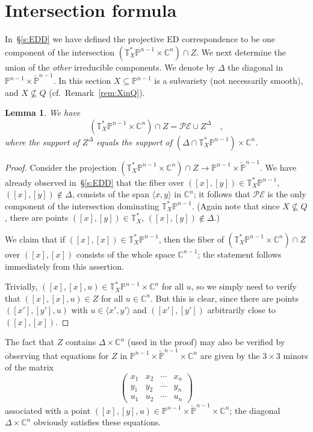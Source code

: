 \documentclass[11pt]{amsart}
\newtheorem{lemma}[theorem]{Lemma}
\numberwithin{equation}{section}
\newcommand{\Cbb}{{\mathbb{C}}}
\newcommand{\Pbb}{{\mathbb{P}}}
\newcommand{\cPbb}{{\check\Pbb}}
\newcommand{\Tbb}{{\mathbb{T}}}
\newcommand{\cE}{{\mathcal E}}
\newcommand{\cP}{{\mathcal P}}
\begin{document}

\section{Intersection formula}\label{s:If}

In~\S\ref{s:EDD} we have defined the projective ED correspondence to be one component
of the intersection $(\Tbb^*_X\Pbb^{n-1}\times \Cbb^n)\cap Z$. We next determine
the union of the {\em other\/} irreducible components.
We denote by $\Delta$ the diagonal in $\Pbb^{n-1}\times \cPbb^{n-1}$.
In this section $X\subseteq \Pbb^{n-1}$ is a subvariety (not necessarily smooth),
and $X\not\subseteq Q$ (cf.~Remark~\ref{rem:XinQ}).

\begin{lemma}\label{lem:Zdec}
We have
\[
(\Tbb^*_X\Pbb^{n-1}\times \Cbb^n)\cap Z = \cP\cE\cup Z^\Delta\quad,
\] 
where the support of $Z^\Delta$ equals the support of
$(\Delta\cap \Tbb^*_X\Pbb^{n-1})\times \Cbb^n$.
\end{lemma}

\begin{proof}
Consider the projection $(\Tbb^*_X\Pbb^{n-1}\times \Cbb^n)\cap Z \to \Pbb^{n-1}\times 
\cPbb^{n-1}$. We have already observed in~\S\ref{s:EDD} that the fiber over 
$([x],[y])\in \Tbb^*_X\Pbb^{n-1}$, $([x],[y])\not\in \Delta$, consists of the span $\langle x,y\rangle$
in $\Cbb^n$; it follows that $\cP\cE$ is the only component of the intersection dominating
$\Tbb^*_X\Pbb^{n-1}$. (Again note that since $X\not\subseteq Q$, there are points
$([x],[y])\in \Tbb^*_X$, $([x],[y])\not\in \Delta$.)

We claim that if $([x],[x])\in \Tbb^*_X\Pbb^{n-1}$, then the fiber of
$(\Tbb^*_X\Pbb^{n-1}\times \Cbb^n)\cap Z$ over $([x],[x])$ consists of the whole
space $\Cbb^{n-1}$; the statement follows immediately from this assertion.

Trivially, $([x],[x],u)\in \Tbb^*_X\Pbb^{n-1}\times \Cbb^n$ for all $u$, so we simply need to
verify that $([x],[x],u)\in Z$ for all $u\in \Cbb^n$. But this is clear, since there are points
$([x'],[y'],u)$ with $u\in \langle x', y'\rangle$ and $([x'],[y'])$ arbitrarily close to $([x],[x])$.
\end{proof}

The fact that $Z$ contains $\Delta\times \Cbb^n$ (used in the proof) may also be verified
by observing that equations for $Z$ in $\Pbb^{n-1}\times \cPbb^{n-1}\times \Cbb^n$
are given by the $3\times 3$ minors of the matrix
\begin{equation}\label{eq:Zeq}
\begin{pmatrix}
x_1 & x_2 & \cdots & x_n \\
y_1 & y_2 & \cdots & y_n \\
u_1 & u_2 & \cdots & u_n
\end{pmatrix}
\end{equation}
associated with a point $([x],[y],u)\in \Pbb^{n-1}\times \cPbb^{n-1}\times \Cbb^n$; the
diagonal $\Delta\times \Cbb^n$ obviously satisfies these equations.
\end{document}
